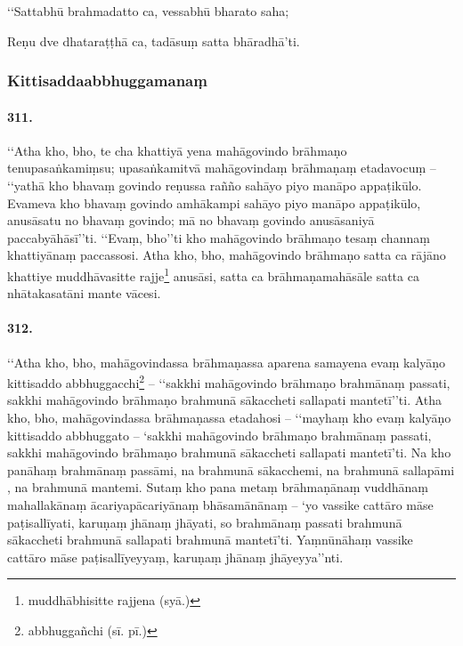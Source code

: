 ‘‘Sattabhū brahmadatto ca, vessabhū bharato saha;

Reṇu dve dhataraṭṭhā ca, tadāsuṃ satta bhāradhā’ti.


\subsubsection{Kittisaddaabbhuggamanaṃ}

\paragraph{311.} ‘‘Atha kho, bho, te cha khattiyā yena mahāgovindo brāhmaṇo tenupasaṅkamiṃsu; upasaṅkamitvā mahāgovindaṃ brāhmaṇaṃ etadavocuṃ – ‘‘yathā kho bhavaṃ govindo reṇussa rañño sahāyo piyo manāpo appaṭikūlo. Evameva kho bhavaṃ govindo amhākampi sahāyo piyo manāpo appaṭikūlo, anusāsatu no bhavaṃ govindo; mā no bhavaṃ govindo anusāsaniyā paccabyāhāsī’’ti. ‘‘Evaṃ, bho’’ti kho mahāgovindo brāhmaṇo tesaṃ channaṃ khattiyānaṃ paccassosi. Atha kho, bho, mahāgovindo brāhmaṇo satta ca rājāno khattiye muddhāvasitte rajje\footnote{muddhābhisitte rajjena (syā.)} anusāsi, satta ca brāhmaṇamahāsāle satta ca nhātakasatāni mante vācesi.

\paragraph{312.} ‘‘Atha kho, bho, mahāgovindassa brāhmaṇassa aparena samayena evaṃ kalyāṇo kittisaddo abbhuggacchi\footnote{abbhuggañchi (sī. pī.)} – ‘‘sakkhi mahāgovindo brāhmaṇo brahmānaṃ passati, sakkhi mahāgovindo brāhmaṇo brahmunā sākaccheti sallapati mantetī’’ti. Atha kho, bho, mahāgovindassa brāhmaṇassa etadahosi – ‘‘mayhaṃ kho evaṃ kalyāṇo kittisaddo abbhuggato – ‘sakkhi mahāgovindo brāhmaṇo brahmānaṃ passati, sakkhi mahāgovindo brāhmaṇo brahmunā sākaccheti sallapati mantetī’ti. Na kho panāhaṃ brahmānaṃ passāmi, na brahmunā sākacchemi, na brahmunā sallapāmi , na brahmunā mantemi. Sutaṃ kho pana metaṃ brāhmaṇānaṃ vuddhānaṃ mahallakānaṃ ācariyapācariyānaṃ bhāsamānānaṃ – ‘yo vassike cattāro māse paṭisallīyati, karuṇaṃ jhānaṃ jhāyati, so brahmānaṃ passati brahmunā sākaccheti brahmunā sallapati brahmunā mantetī’ti. Yaṃnūnāhaṃ vassike cattāro māse paṭisallīyeyyaṃ, karuṇaṃ jhānaṃ jhāyeyya’’nti.

